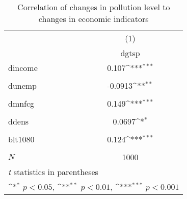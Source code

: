 \begin{table}[htbp]\centering
\def\sym#1{\ifmmode^{#1}\else\(^{#1}\)\fi}
\caption{Correlation of changes in pollution level to changes in economic indicators\label{IIa6}}
\begin{tabular}{l*{1}{c}}
\hline\hline
            &\multicolumn{1}{c}{(1)}\\
            &\multicolumn{1}{c}{dgtsp}\\
\hline
dincome     &       0.107\sym{***}\\
            &                     \\
[1em]
dunemp      &     -0.0913\sym{**} \\
            &                     \\
[1em]
dmnfcg      &       0.149\sym{***}\\
            &                     \\
[1em]
ddens       &      0.0697\sym{*}  \\
            &                     \\
[1em]
blt1080     &       0.124\sym{***}\\
            &                     \\
\hline
\(N\)       &        1000         \\
\hline\hline
\multicolumn{2}{l}{\footnotesize \textit{t} statistics in parentheses}\\
\multicolumn{2}{l}{\footnotesize \sym{*} \(p<0.05\), \sym{**} \(p<0.01\), \sym{***} \(p<0.001\)}\\
\end{tabular}
\end{table}
